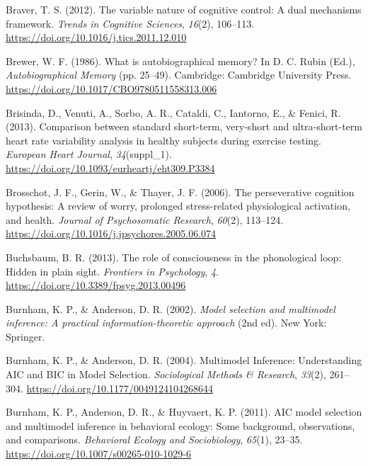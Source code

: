 \documentclass[a4paper,12pt,twoside,openright,oldfontcommands]{memoir}
\begin{document}
\leavevmode\hypertarget{ref-braver_variable_2012}{}%
Braver, T. S. (2012). The variable nature of cognitive control: A dual mechanisms framework. \emph{Trends in Cognitive Sciences}, \emph{16}(2), 106--113. \url{https://doi.org/10.1016/j.tics.2011.12.010}

\leavevmode\hypertarget{ref-rubin_what_1986}{}%
Brewer, W. F. (1986). What is autobiographical memory? In D. C. Rubin (Ed.), \emph{Autobiographical Memory} (pp. 25--49). Cambridge: Cambridge University Press. \url{https://doi.org/10.1017/CBO9780511558313.006}

\leavevmode\hypertarget{ref-brisinda_comparison_2013}{}%
Brisinda, D., Venuti, A., Sorbo, A. R., Cataldi, C., Iantorno, E., \& Fenici, R. (2013). Comparison between standard short-term, very-short and ultra-short-term heart rate variability analysis in healthy subjects during exercise testing. \emph{European Heart Journal}, \emph{34}(suppl\_1). \url{https://doi.org/10.1093/eurheartj/eht309.P3384}

\leavevmode\hypertarget{ref-Brosschot2006}{}%
Brosschot, J. F., Gerin, W., \& Thayer, J. F. (2006). The perseverative cognition hypothesis: A review of worry, prolonged stress-related physiological activation, and health. \emph{Journal of Psychosomatic Research}, \emph{60}(2), 113--124. \url{https://doi.org/10.1016/j.jpsychores.2005.06.074}

\leavevmode\hypertarget{ref-buchsbaum_role_2013}{}%
Buchsbaum, B. R. (2013). The role of consciousness in the phonological loop: Hidden in plain sight. \emph{Frontiers in Psychology}, \emph{4}. \url{https://doi.org/10.3389/fpsyg.2013.00496}

\leavevmode\hypertarget{ref-burnham_model_2002}{}%
Burnham, K. P., \& Anderson, D. R. (2002). \emph{Model selection and multimodel inference: A practical information-theoretic approach} (2nd ed). New York: Springer.

\leavevmode\hypertarget{ref-burnham_multimodel_2004}{}%
Burnham, K. P., \& Anderson, D. R. (2004). Multimodel Inference: Understanding AIC and BIC in Model Selection. \emph{Sociological Methods \& Research}, \emph{33}(2), 261--304. \url{https://doi.org/10.1177/0049124104268644}

\leavevmode\hypertarget{ref-burnham_aic_2011}{}%
Burnham, K. P., Anderson, D. R., \& Huyvaert, K. P. (2011). AIC model selection and multimodel inference in behavioral ecology: Some background, observations, and comparisons. \emph{Behavioral Ecology and Sociobiology}, \emph{65}(1), 23--35. \url{https://doi.org/10.1007/s00265-010-1029-6}
\end{document}
